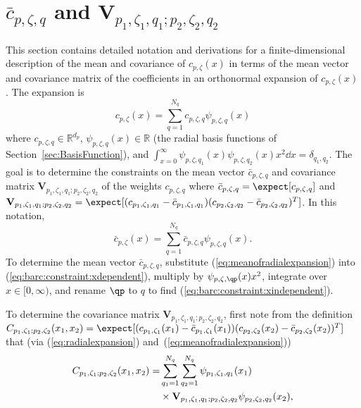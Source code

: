 \section{$\bar c_{p,\zeta,q}$ and $\mathbf{V}_{p_1,\zeta_1,q_1;p_2,\zeta_2,q_2}$}
\label{sec:finitedimensional}
This section contains detailed notation and derivations for a
finite-dimensional description of the mean and covariance of
$c_{p,\zeta}(x)$ in terms of the mean vector and covariance matrix of the
coefficients in an orthonormal expansion of $c_{p,\zeta}(x)$.
The expansion is
\begin{equation}
c_{p,\zeta}(x)
=
\sum_{q=1}^{N_q}
c_{p,\zeta,q}
\psi_{p,\zeta,q}(x)
\label{eq:radialexpansion}
\end{equation}
where
$c_{p,\zeta,q}\in\mathbb{R}^{d_p}$,
$\psi_{p,\zeta,q}(x)\in\mathbb{R}$
(the radial basis functions of Section~\ref{sec:BasisFunction}),
and
$\int_{x=0}^\infty
\psi_{p,\zeta,q_1}(x)
\psi_{p,\zeta,q_2}(x)
x^2 \dd x
=
\delta_{q_1,q_2}
$.
The goal is to determine the constraints on the mean vector
$\bar c_{p,\zeta,q}$ and covariance matrix $\mathbf{V}_{p_1,\zeta_1,q_1;p_2,\zeta_2,q_2}$
of the weights $c_{p,\zeta,q}$ where
$\bar c_{p,\zeta,q}=\expect[c_{p,\zeta,q}]$
and
$\mathbf{V}_{p_1,\zeta_1,q_1;p_2,\zeta_2,q_2}=\expect[
(c_{p_1,\zeta_1,q_1}-\bar c_{p_1,\zeta_1,q_1})
(c_{p_2,\zeta_2,q_2}-\bar c_{p_2,\zeta_2,q_2})^T]$.
In this notation,
\begin{equation}
\bar c_{p,\zeta}(x)
=
\sum_{q=1}^{N_q}
\bar c_{p,\zeta,q}
\psi_{p,\zeta,q}(x)
\label{eq:meanofradialexpansion}
.
\end{equation}
To determine the mean vector $\bar c_{p,\zeta,q}$,
substitute (\ref{eq:meanofradialexpansion}) %
into
(\ref{eq:barc:constraint:xdependent}), %
multiply by $\psi_{p,\zeta,\qp}(x) x^2$, integrate over
$x\in[0,\infty)$, and rename $\qp$ to $q$ to find
(\ref{eq:barc:constraint:xindependent}).
\par
To determine the covariance matrix $\mathbf{V}_{p_1,\zeta_1,q_1;p_2,\zeta_2,q_2}$,
first note from the definition
$\CcREAL(x_1,x_2)=\expect[(c_{p_1,\zeta_1}(x_1)-\bar c_{p_1,\zeta_1}(x_1))
(c_{p_2,\zeta_2}(x_2)-\bar c_{p_2,\zeta_2}(x_2))^T]$
that (via
(\ref{eq:radialexpansion}) and~(\ref{eq:meanofradialexpansion}))
\begin{align}
\begin{aligned}[t]
C_{p_1,\zeta_1;p_2,\zeta_2}(x_1,x_2)=
&\sum_{q_1=1}^{N_q}
\sum_{q_2=1}^{N_q}
\psi_{p_1,\zeta_1,q_1}(x_1)\\
&{}\times \mathbf{V}_{p_1,\zeta_1,q_1;p_2,\zeta_2,q_2}
\psi_{p_2,\zeta_2,q_2}(x_2),
\end{aligned}
\label{eq:covarianceofradialexpansion}
\end{align}
